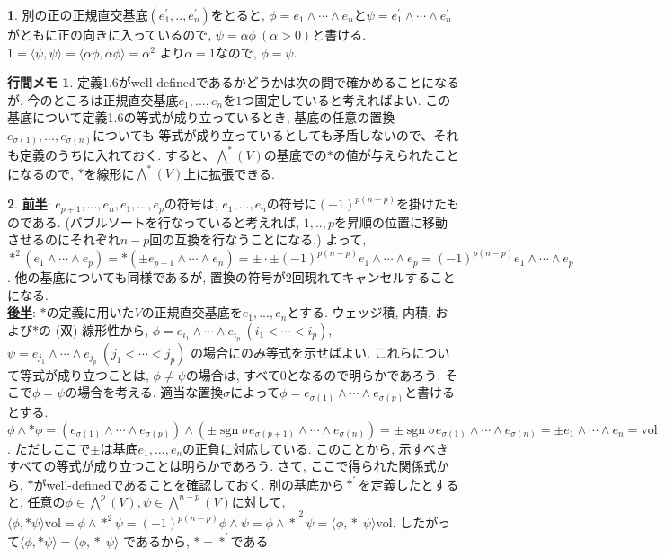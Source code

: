 \documentclass[dvipdfmx]{amsart}
\theoremstyle{definition}
\newtheorem{ans}{}
\numberwithin{ans}{section}
\newtheorem{mynote}{行間メモ}
\numberwithin{mynote}{section}
\newenvironment{note}
  {\begin{leftbar}\begin{mynote}}
  {\end{mynote}\end{leftbar}}
\DeclareMathOperator*{\sgn}{sgn}
\begin{document}
\begin{ans}
  別の正の正規直交基底$(e^\prime_1,.., e^\prime_n)$をとると,
  $\phi = e_1 \wedge \cdots \wedge e_n$と$\psi = e^\prime_1 \wedge \cdots \wedge e^\prime_n$
  がともに正の向きに入っているので, $\psi = \alpha \phi\ (\alpha > 0)$と書ける.
  $1 = \langle \psi, \psi \rangle = \langle \alpha \phi, \alpha \phi \rangle = \alpha^2$
  より$\alpha = 1$なので, $\phi = \psi$.
\end{ans}

\begin{note}
  定義1.6がwell-definedであるかどうかは次の問で確かめることになるが,
  今のところは正規直交基底$e_1,...,e_n$を$1$つ固定していると考えればよい.
  この基底について定義1.6の等式が成り立っているとき,
  基底の任意の置換$e_{\sigma(1)},...,e_{\sigma(n)}$についても
  等式が成り立っているとしても矛盾しないので、それも定義のうちに入れておく.
  すると、$\bigwedge^\ast(V)$の基底での$\ast$の値が与えられたことになるので,
  $\ast$を線形に$\bigwedge^\ast(V)$上に拡張できる.
\end{note}

\begin{ans}
  \underline{\textbf{前半}}: $e_{p+1},...,e_n,e_1,...,e_p$の符号は,
  $e_1,...,e_n$の符号に$(-1)^{p(n-p)}$を掛けたものである.
  (バブルソートを行なっていると考えれば, $1,..,p$を昇順の位置に移動させるのにそれぞれ$n-p$回の互換を行なうことになる.)
  よって, $\ast^2(e_1 \wedge \cdots \wedge e_p)
  = \ast(\pm e_{p+1} \wedge \cdots \wedge e_n)
  = \pm \cdot \pm (-1)^{p(n-p)}e_1 \wedge \cdots \wedge e_p
  = (-1)^{p(n-p)}e_1 \wedge \cdots \wedge e_p
  $. 他の基底についても同様であるが, 置換の符号が$2$回現れてキャンセルすることになる.\\
  \underline{\textbf{後半}}: $\ast$の定義に用いた$V$の正規直交基底を$e_1,...,e_n$とする.
  ウェッジ積, 内積, および$\ast$の (双) 線形性から,
  $\phi = e_{i_1} \wedge \cdots \wedge e_{i_p}\ (i_1 < \cdots < i_p)$,
  $\psi = e_{j_1} \wedge \cdots \wedge e_{j_p}\ (j_1 < \cdots < j_p)$
  の場合にのみ等式を示せばよい.
  これらについて等式が成り立つことは, $\phi \neq \psi$の場合は, すべて$0$となるので明らかであろう.
  そこで$\phi = \psi$の場合を考える.
  適当な置換$\sigma$によって$\phi = e_{\sigma(1)} \wedge \cdots \wedge e_{\sigma(p)}$と書けるとする.
  $\phi \wedge \ast \phi
  = (e_{\sigma(1)} \wedge \cdots \wedge e_{\sigma(p)}) \wedge (\pm \sgn \sigma e_{\sigma(p + 1)} \wedge \cdots \wedge e_{\sigma(n)})
  = \pm \sgn \sigma e_{\sigma(1)} \wedge \cdots \wedge e_{\sigma(n)}
  = \pm e_1 \wedge \cdots \wedge e_n
  = \mathrm{vol}
  $. ただしここで$\pm$は基底$e_1,...,e_n$の正負に対応している. このことから, 示すべきすべての等式が成り立つことは明らかであろう.
  さて, ここで得られた関係式から, $\ast$がwell-definedであることを確認しておく.
  別の基底から$\ast^\prime$を定義したとすると,
  任意の$\phi \in \bigwedge^p(V), \psi \in \bigwedge^{n-p}(V)$に対して,
  $\langle \phi, \ast \psi \rangle \mathrm{vol}
  = \phi \wedge \ast^2 \psi
  = (-1)^{p(n-p)}\phi \wedge \psi
  = \phi \wedge {\ast^\prime}^2 \psi
  = \langle \phi, \ast^\prime \psi \rangle \mathrm{vol}$.
  したがって$\langle \phi, \ast \psi \rangle = \langle \phi, \ast^\prime \psi \rangle$
  であるから, $\ast = \ast^\prime$である.
\end{ans}
\end{document}

